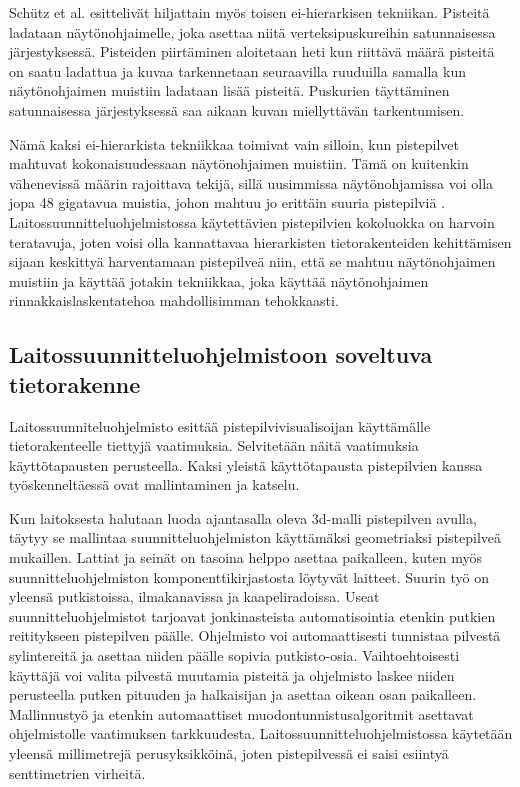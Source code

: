 Schütz et al. \cite{progressive} esittelivät hiljattain myös toisen ei-hierarkisen tekniikan. Pisteitä ladataan näytönohjaimelle, joka asettaa niitä verteksipuskureihin satunnaisessa järjestyksessä. Pisteiden piirtäminen aloitetaan heti kun riittävä määrä pisteitä on saatu ladattua ja kuvaa tarkennetaan seuraavilla ruuduilla samalla kun näytönohjaimen muistiin ladataan lisää pisteitä. Puskurien täyttäminen satunnaisessa järjestyksessä saa aikaan kuvan miellyttävän tarkentumisen.

Nämä kaksi ei-hierarkista tekniikkaa toimivat vain silloin, kun pistepilvet mahtuvat kokonaisuudessaan näytönohjaimen muistiin. Tämä on kuitenkin vähenevissä määrin rajoittava tekijä, sillä uusimmissa näytönohjamissa voi olla jopa 48 gigatavua muistia, johon mahtuu jo erittäin suuria pistepilviä \cite{rtx}. Laitossuunnitteluohjelmistossa käytettävien pistepilvien kokoluokka on harvoin teratavuja, joten voisi olla kannattavaa hierarkisten tietorakenteiden kehittämisen sijaan keskittyä harventamaan pistepilveä niin, että se mahtuu näytönohjaimen muistiin ja käyttää jotakin tekniikkaa, joka käyttää näytönohjaimen rinnakkaislaskentatehoa mahdollisimman tehokkaasti.

\subsection{Laitossuunnitteluohjelmistoon soveltuva tietorakenne}\label{usecase}

Laitossuunniteluohjelmisto esittää pistepilvivisualisoijan käyttämälle tietorakenteelle tiettyjä vaatimuksia. Selvitetään näitä vaatimuksia käyttötapausten perusteella. Kaksi yleistä käyttötapausta pistepilvien kanssa työskenneltäessä ovat mallintaminen ja katselu. 

Kun laitoksesta halutaan luoda ajantasalla oleva 3d-malli pistepilven avulla, täytyy se mallintaa suunnitteluohjelmiston käyttämäksi geometriaksi pistepilveä mukaillen. Lattiat ja seinät on tasoina helppo asettaa paikalleen, kuten myös suunnitteluohjelmiston komponenttikirjastosta löytyvät laitteet. Suurin työ on yleensä putkistoissa, ilmakanavissa ja kaapeliradoissa. Useat suunnitteluohjelmistot tarjoavat jonkinasteista automatisointia etenkin putkien reititykseen pistepilven päälle. Ohjelmisto voi automaattisesti tunnistaa pilvestä sylintereitä ja asettaa niiden päälle sopivia putkisto-osia. Vaihtoehtoisesti käyttäjä voi valita pilvestä muutamia pisteitä ja ohjelmisto laskee niiden perusteella putken pituuden ja halkaisijan ja asettaa oikean osan paikalleen. Mallinnustyö ja etenkin automaattiset muodontunnistusalgoritmit asettavat ohjelmistolle vaatimuksen tarkkuudesta. Laitossuunnitteluohjelmistossa käytetään yleensä millimetrejä perusyksikköinä, joten pistepilvessä ei saisi esiintyä senttimetrien virheitä.

